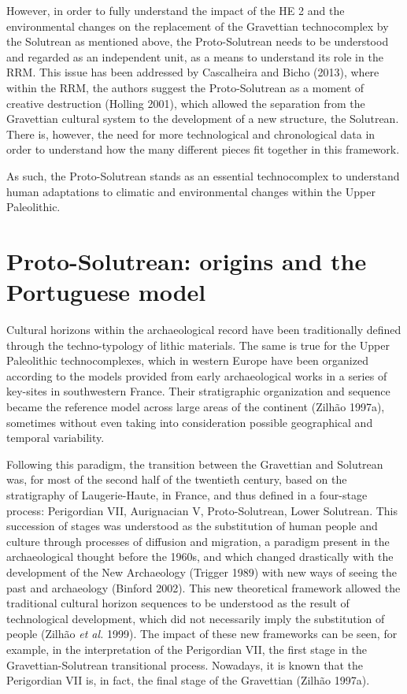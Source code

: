 \documentclass[12pt,twoside]{reedthesis}
\begin{document}
However, in order to fully understand the impact of the HE 2 and the environmental changes on the replacement of the Gravettian technocomplex by the Solutrean as mentioned above, the Proto-Solutrean needs to be understood and regarded as an independent unit, as a means to understand its role in the RRM. This issue has been addressed by Cascalheira and Bicho (2013), where within the RRM, the authors suggest the Proto-Solutrean as a moment of creative destruction (Holling 2001), which allowed the separation from the Gravettian cultural system to the development of a new structure, the Solutrean. There is, however, the need for more technological and chronological data in order to understand how the many different pieces fit together in this framework.

As such, the Proto-Solutrean stands as an essential technocomplex to understand human adaptations to climatic and environmental changes within the Upper Paleolithic.

\hypertarget{proto-solutrean-origins-and-the-portuguese-model}{%
\section{Proto-Solutrean: origins and the Portuguese model}\label{proto-solutrean-origins-and-the-portuguese-model}}

Cultural horizons within the archaeological record have been traditionally defined through the techno-typology of lithic materials. The same is true for the Upper Paleolithic technocomplexes, which in western Europe have been organized according to the models provided from early archaeological works in a series of key-sites in southwestern France. Their stratigraphic organization and sequence became the reference model across large areas of the continent (Zilhão 1997a), sometimes without even taking into consideration possible geographical and temporal variability.

Following this paradigm, the transition between the Gravettian and Solutrean was, for most of the second half of the twentieth century, based on the stratigraphy of Laugerie-Haute, in France, and thus defined in a four-stage process: Perigordian VII, Aurignacian V, Proto-Solutrean, Lower Solutrean. This succession of stages was understood as the substitution of human people and culture through processes of diffusion and migration, a paradigm present in the archaeological thought before the 1960s, and which changed drastically with the development of the New Archaeology (Trigger 1989) with new ways of seeing the past and archaeology (Binford 2002). This new theoretical framework allowed the traditional cultural horizon sequences to be understood as the result of technological development, which did not necessarily imply the substitution of people (Zilhão \emph{et al.} 1999). The impact of these new frameworks can be seen, for example, in the interpretation of the Perigordian VII, the first stage in the Gravettian-Solutrean transitional process. Nowadays, it is known that the Perigordian VII is, in fact, the final stage of the Gravettian (Zilhão 1997a).
\end{document}
